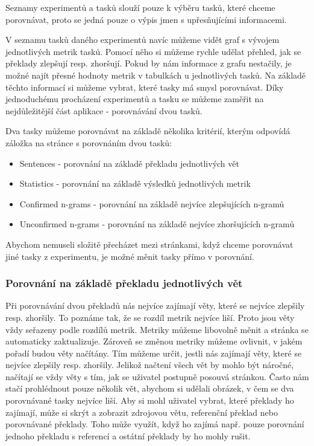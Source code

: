 Seznamy experimentů a tasků slouží pouze k výběru tasků,
  které chceme porovnávat,
  proto se jedná pouze o výpis jmen s upřesňujícími informacemi.

V seznamu tasků daného experimentů navíc můžeme vidět graf s vývojem jednotlivých metrik tasků.
Pomocí něho si můžeme rychle udělat přehled,
  jak se překlady zlepšují resp. zhoršují.
Pokud by nám informace z grafu nestačily,
  je možné najít přesné hodnoty metrik v tabulkách u jednotlivých tasků.
Na základě těchto informací si můžeme vybrat,
  které tasky má smysl porovnávat.
Díky jednoduchému procházení experimentů a tasku se můžeme zaměřit na nejdůležitější část aplikace
  - porovnávání dvou tasků.

Dva tasky můžeme porovnávat na základě několika kritérií,
  kterým odpovídá záložka na stránce s porovnáním dvou tasků:
\begin{itemize}
  \item Sentences - porovnání na základě překladu jednotlivých vět
  \item Statistics - porovnání na základě výsledků jednotlivých metrik
  \item Confirmed n-grams - porovnání na základě nejvíce zlepšujících n-gramů
  \item Unconfirmed n-grams - porovnání na základě nejvíce zhoršujících n-gramů
\end{itemize}

Abychom nemuseli složitě přecházet mezi stránkami,
  když chceme porovnávat jiné tasky z experimentu,
  je možné měnit tasky přímo v porovnání.


\subsubsection{Porovnání na základě překladu jednotlivých vět}
Při porovnávání dvou překladů nás nejvíce zajímají věty,
  které se nejvíce zlepšily resp. zhoršily.
To poznáme tak, že se rozdíl metrik nejvíce liší. 
Proto jsou věty vždy seřazeny podle rozdílů metrik.
Metriky můžeme libovolně měnit a stránka se automaticky zaktualizuje.
Zároveň se změnou metriky můžeme ovlivnit,
  v jakém pořadí budou věty načítány.
Tím můžeme určit,
  jestli nás zajímají věty,
  které se nejvíce zlepšily resp. zhoršily.
Jelikož načtení všech vět by mohlo být náročné,
  načítají se vždy věty s tím,
  jak se uživatel postupně posouvá stránkou.
Často nám stačí prohlédnout pouze několik vět,
  abychom si udělali obrázek,
  v čem se dva porovnávané tasky nejvíce liší.
Aby si mohl uživatel vybrat,
  které překlady ho zajímají,
  může si skrýt a zobrazit zdrojovou větu, referenční překlad nebo porovnávané překlady.
Toho může využít, když ho zajímá např. pouze porovnání jednoho překladu s referencí a
  ostátní překlady by ho mohly rušit.

